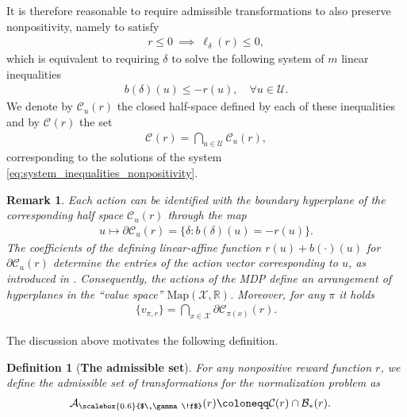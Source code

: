 \documentclass[10pt,leqno]{amsart}
\newcommand{\R}{\mathbb{R}}
\newcommand{\U}{\mathcal{U}}
\newcommand{\X}{\mathcal{X}}
\newcommand{\cost}{r}
\newcommand{\vv}{v_{\policy, \cost}}
\newcommand{\f}{f}
\newcommand{\policy}{\pi}
\newcommand{\state}{x} %
\newcommand{\act}{u}   %
\newcommand{\disc}{\gamma}
\newcommand{\advset}[2]{\mathcal{C}_{#1}(#2)}
\newcommand{\feasset}[1]{\mathcal{A}_{\scalebox{0.6}{$\,\disc\!\f$}}(#1)}
\newcommand{\lintransf}{b}
\newcommand{\maps}{\text{Map}}
\newcommand{\actAdvsym}{\ell}
\newcommand{\actAdv}[1]{\actAdvsym_{#1}}
\newtheorem{definition}[theorem]{Definition}
\newtheorem{remark}[theorem]{Remark}
\begin{document}
%
%
%
%
%
\noindent It is therefore reasonable to require admissible transformations to also preserve nonpositivity, namely to satisfy
\begin{align}
    \cost \leq 0 ~\implies~ \actAdv{\delta}(\cost) \leq 0,
\end{align}
which is equivalent to requiring $\delta$ to solve the following system of $m$ linear inequalities
\begin{align}\label{eq:system_inequalities_nonpositivity}
    \lintransf(\delta)(\act) \leq -\cost(\act), \quad \forall \act \in \U.
\end{align}
We denote by $\advset{\act}{\cost}$ the closed half-space defined by each of these inequalities and by $\advset{}{\cost}$ the set 
\begin{align}
    \advset{}{\cost} = \bigcap_{\act \in \U} \advset{\act}{\cost},
\end{align}
corresponding to the solutions of the system \eqref{eq:system_inequalities_nonpositivity}.
\begin{remark}\label{rem:geometric_actions}
    Each action can be identified with the boundary hyperplane of the corresponding half space $\advset{\act}{\cost}$ through the map 
    \begin{align*}
        \act \mapsto \partial\mathcal{C}_\act(\cost) = \{ \delta : \lintransf(\delta)(\act) = -\cost(\act) \}.
    \end{align*} 
    The coefficients of the defining linear-affine function $\cost(\act) + \lintransf(\cdot)(\act)$ for $\partial\mathcal{C}_\act(\cost)$ determine the entries of the action vector corresponding to $\act$, as introduced in \cite{mustafin2025mdpgeometrynormalizationreward}. Consequently, the actions of the MDP define an arrangement of hyperplanes in the ``value space'' $\maps(\X, \R)$. Moreover, for any $\policy$ it holds
    \begin{align}
        \{\vv\} = \bigcap_{\state \in \X} \partial\mathcal{C}_{\policy(\state)}(\cost).
    \end{align}
\end{remark}
\noindent The discussion above motivates the following definition.
\begin{definition}[\textbf{The admissible set}]
    For any nonpositive reward function $\cost$, we define the admissible set of transformations for the normalization problem as
    \begin{align}\label{eq:admissible_set_def}
        \feasset{\cost} &\coloneqq \advset{}{\cost} \cap \mathcal{B}_*(\cost).
    \end{align}
\end{definition}
\end{document}
